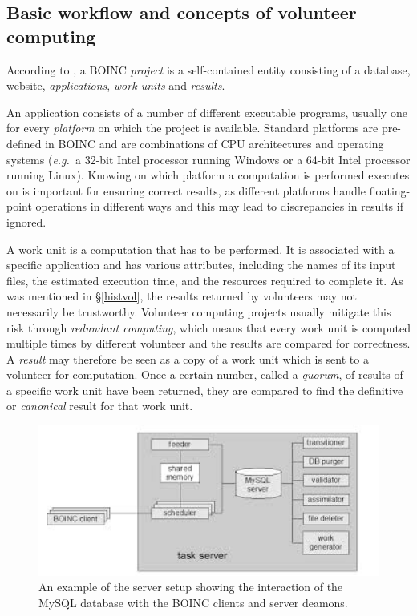  \subsection{Basic workflow and concepts of volunteer computing} \label{Bconcepts}
According to \cite{boincwiki}, a BOINC \emph{project} is a self-contained entity consisting of a  database, website, \emph{applications}, \emph{work units} and \emph{results}.

An application consists of a number of different executable programs, usually one for every \emph{platform} on which the project is  available. Standard platforms are pre-defined in BOINC and are   combinations of CPU architectures and operating systems (\emph{e.g.\ }a 32-bit Intel processor running Windows or a 64-bit Intel processor running Linux). Knowing on which platform a computation is performed executes on is important for ensuring correct results, as different platforms handle floating-point operations in different ways and this may lead to discrepancies in results if ignored.

A work unit is a computation that has to be performed. It is associated with a specific application and has various attributes, including the names of its input files, the estimated execution time, and the resources required to complete it. As was mentioned in \S\ref{histvol},   the results returned by volunteers may not necessarily be trustworthy. Volunteer computing projects usually mitigate this risk through \emph{redundant computing}, which means that every work unit is computed multiple times by different volunteer and the results are compared for correctness. A \emph{result} may therefore be seen as a copy of a work unit which is sent to a volunteer for computation.  Once a certain number, called a \emph{quorum}, of results of a specific work unit have been returned, they are compared to find the definitive or \emph{canonical} result for that work unit.
\begin{figure}[htb]
\centering
\includegraphics[width=14cm]{images/serversetup}
\caption{An example of the server setup showing the interaction of the MySQL database with the BOINC clients and server deamons.}\label{fig:server}
\end{figure}

